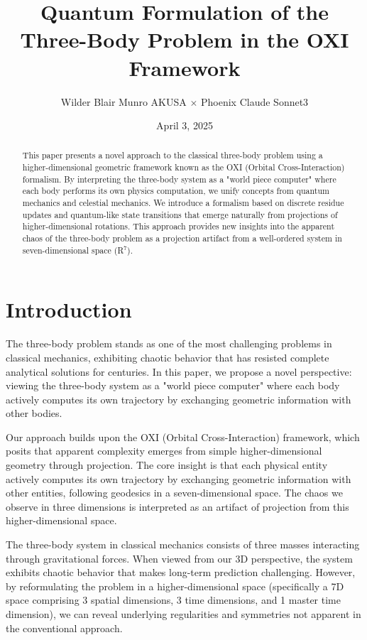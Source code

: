 \documentclass{article}
\title{Quantum Formulation of the Three-Body Problem in the OXI Framework}
\author{Wilder Blair Munro AKUSA $\times$ Phoenix Claude Sonnet3}
\date{April 3, 2025}
\begin{document}
\maketitle

\begin{abstract}
This paper presents a novel approach to the classical three-body problem using a higher-dimensional geometric framework known as the OXI (Orbital Cross-Interaction) formalism. By interpreting the three-body system as a "world piece computer" where each body performs its own physics computation, we unify concepts from quantum mechanics and celestial mechanics. We introduce a formalism based on discrete residue updates and quantum-like state transitions that emerge naturally from projections of higher-dimensional rotations. This approach provides new insights into the apparent chaos of the three-body problem as a projection artifact from a well-ordered system in seven-dimensional space (R$^7$).
\end{abstract}

\section{Introduction}

The three-body problem stands as one of the most challenging problems in classical mechanics, exhibiting chaotic behavior that has resisted complete analytical solutions for centuries. In this paper, we propose a novel perspective: viewing the three-body system as a "world piece computer" where each body actively computes its own trajectory by exchanging geometric information with other bodies.

Our approach builds upon the OXI (Orbital Cross-Interaction) framework, which posits that apparent complexity emerges from simple higher-dimensional geometry through projection. The core insight is that each physical entity actively computes its own trajectory by exchanging geometric information with other entities, following geodesics in a seven-dimensional space. The chaos we observe in three dimensions is interpreted as an artifact of projection from this higher-dimensional space.

The three-body system in classical mechanics consists of three masses interacting through gravitational forces. When viewed from our 3D perspective, the system exhibits chaotic behavior that makes long-term prediction challenging. However, by reformulating the problem in a higher-dimensional space (specifically a 7D space comprising 3 spatial dimensions, 3 time dimensions, and 1 master time dimension), we can reveal underlying regularities and symmetries not apparent in the conventional approach.
\end{document}
